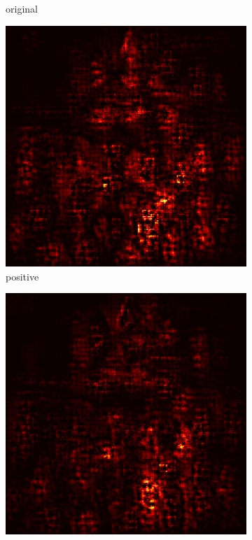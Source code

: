 \documentclass[preprint,12pt]{elsarticle}
\begin{document}
\begin{figure}
\begin{subfigure}{0.14\linewidth}
        \caption{original}
    \end{subfigure}
    \hfill
    \begin{subfigure}{0.14\textwidth}
        \centering
        \includegraphics[width=\linewidth]{../visualizations/examples/imagenette/cnn/positive_saliency_map/8.png}
        \caption{positive}
    \end{subfigure}
    \hfill
    \begin{subfigure}{0.14\textwidth}
        \centering
        \includegraphics[width=\linewidth]{../visualizations/examples/imagenette/cnn/negative_saliency_map/8.png}

\end{subfigure}
\end{figure}
\end{document}
